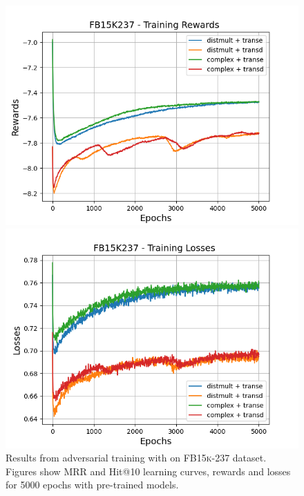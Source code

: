 \begin{figure}
    \begin{minipage}{.5\textwidth}
      \centering
      \includegraphics[width=\linewidth]{figures/results/gan_train/pretrained/random/fb15k237/gan_train_random_fb15k237_rewards.png}
    \end{minipage}%
     \begin{minipage}{.5\textwidth}
      \centering
      \includegraphics[width=\linewidth]{figures/results/gan_train/pretrained/random/fb15k237/gan_train_random_fb15k237_losses.png}
    \end{minipage}%
    \caption{Results from adversarial training with \origsampling on \textsc{FB15k-237} dataset.
    Figures show MRR and Hit@10 learning curves, rewards and losses for 5000 epochs with pre-trained models.}
    \label{fig:gan_train_pretrained_random_fb15k237}
\end{figure}
